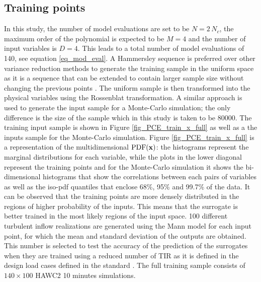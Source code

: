 \documentclass[preprint,12pt]{elsarticle}
\begin{document}
\subsection{Training points}

In this study, the number of model evaluations are set to be $N=2\,N_c$, the maximum order of the polynomial is expected to be $M=4$ and the number of input variables is $D=4$. This leads to a total number of model evaluations of 140, see equation \ref{eq_mod_eval}. %
A Hammersley sequence \cite{hammersley1960monte} is preferred over other variance reduction methods to generate the training sample in the uniform space as it is a sequence that can be extended to contain larger sample size without changing the previous points \cite{feinberg2015chaospy,hosder2007efficient}. The uniform sample is then transformed into the physical variables using the Rossenblat transformation. A similar approach is used to generate the input sample for a Monte-Carlo simulation; the only difference is the size of the sample which in this study is taken to be 80000. The training input sample is shown in Figure \ref{fig_PCE_train_x_full} as well as a the inputs sample for the Monte-Carlo simulation. Figure \ref{fig_PCE_train_x_full} is a representation of the multidimensional $\mathrm{PDF}(\mathbf{x})$: the histograms represent the marginal distributions for each variable, while the plots in the lower diagonal represent the training points and for the Monte-Carlo simulation it shows the bi-dimensional histograms that show the correlations between each pairs of variables as well as the iso-pdf quantiles that enclose 68\%, 95\% and 99.7\% of the data. It can be observed that the training points are more densely distributed in the regions of higher probability of the inputs. This means that the surrogate is better trained in the most likely regions of the input space.  100 different turbulent inflow realizations are generated using the Mann model for each input point, for which the mean and standard deviation of the outputs are obtained. This number is selected to test the accuracy of the prediction of the surrogates when they are trained using a reduced number of TIR as it is defined in the design load cases defined in the standard \cite{international2005iec}. The full training sample consists of $140 \times 100$ HAWC2 10 minutes simulations.
\end{document}
